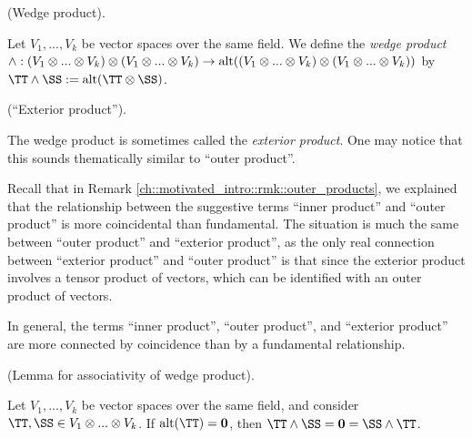 \begin{defn}
    (Wedge product).
    
    Let $V_1, ..., V_k$ be vector spaces over the same field. We define the \textit{wedge product} \\ ${\wedge: (V_1 \otimes ... \otimes V_k) \otimes (V_1 \otimes ... \otimes V_k) \rightarrow \text{alt}((V_1 \otimes ... \otimes V_k) \otimes (V_1 \otimes ... \otimes V_k))}$ by $\TT \wedge \SS := \alt(\TT \otimes \SS)$.
\end{defn}

\begin{remark}
\label{ch::exterior_pwrs::rmk::exterior_product}
    (``Exterior product'').

    The wedge product is sometimes called the \textit{exterior product}. One may notice that this sounds thematically similar to ``outer product''.

    Recall that in Remark \ref{ch::motivated_intro::rmk::outer_products}, we explained that the relationship between the suggestive terms ``inner product'' and ``outer product'' is more coincidental than fundamental. The situation is much the same between ``outer product'' and ``exterior product'', as the only real connection between ``exterior product'' and ``outer product'' is that since the exterior product involves a tensor product of vectors, which can be identified with an outer product of vectors.
    
    In general, the terms ``inner product'', ``outer product'', and ``exterior product'' are more connected by coincidence than by a fundamental relationship.
\end{remark}

\begin{lemma}
    (Lemma for associativity of wedge product). 
    
    Let $V_1, ..., V_k$ be vector spaces over the same field, and consider $\TT, \SS \in V_1 \otimes ... \otimes V_k$. If $\alt(\TT) = \mathbf{0}$, then $\TT \wedge \SS = \mathbf{0} = \SS \wedge \TT$.
\end{lemma}

